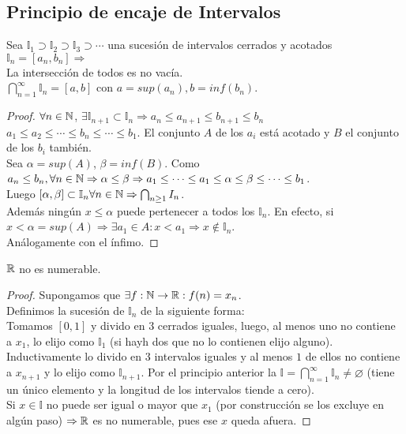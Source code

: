 \subsection{Principio de encaje de Intervalos}

\begin{theorem}
    Sea $\mathbb{I}_1 \supset \mathbb{I}_2 \supset \mathbb{I}_3 \supset \cdots $ una sucesión de intervalos cerrados y acotados $\mathbb{I}_n = [a_n, b_n] \Rightarrow$ \\
    La intersección de todos es no vacía. \\
    $\bigcap_{n=1}^{\infty} \mathbb{I}_n = [a,b]$ con $a = sup(a_n), b=inf(b_n)$.
    \begin{proof}
        $\forall n \in \mathbb{N}$, $\exists \mathbb{I}_{n+1} \subset \mathbb{I}_n \Rightarrow a_n \leq a_{n+1} \leq b_{n+1} \leq b_n$ \\
        $a_1 \leq a_2 \leq \cdots \leq b_n \leq \cdots \leq b_1$. El conjunto $A$ de los $a_i$ está acotado y $B$ el conjunto de los $b_i$ también. \\
        Sea $\alpha = sup(A)$, $\beta = inf(B)$. Como $a_n \leq b_n, \forall n \in \mathbb{N} \Rightarrow \alpha \leq \beta \Rightarrow a_1 \leq \cdots \leq a_1 \leq \alpha \leq \beta \leq \cdots \leq b_1$. \\
        Luego $[\alpha, \beta] \subset \mathbb{I}_n \forall n \in \mathbb{N} \Rightarrow \bigcap_{n\geq1} I_n$. \\
        Además ningún $x \leq \alpha$ puede pertenecer a todos los $\mathbb{I}_n$. En efecto, si $x < \alpha = sup(A) \Rightarrow \exists a_1\in A: x<a_1 \Rightarrow x\notin \mathbb{I}_n$. \\
        Análogamente con el ínfimo.
    \end{proof}
\end{theorem}

\begin{theorem}
    $\mathbb{R}$  no es numerable.
    \begin{proof}
        Supongamos que $\exists f:\mathbb{N} \to \mathbb{R} : f(n) = x_n$. \\
        Definimos la sucesión de $\mathbb{I}_n$ de la siguiente forma: \\
        Tomamos $[0, 1]$ y divido en $3$ cerrados iguales, luego, al menos uno no contiene a $x_1$, lo elijo como $\mathbb{I}_1$ (si hayh dos que no lo contienen elijo alguno). Inductivamente lo divido en $3$ intervalos iguales y al menos $1$ de ellos no contiene a $x_{n+1}$ y lo elijo como $\mathbb{I}_{n+1}$. Por el principio anterior la $\mathbb{I} = \bigcap_{n=1}^\infty \mathbb{I}_n \neq \varnothing$ (tiene un único elemento y la longitud de los intervalos tiende a cero). \\
        Si $x \in \mathbb{I}$ no puede ser igual o mayor que $x_1$ (por construcción se los excluye en algún paso) $\Rightarrow \mathbb{R}$ es no numerable, pues ese $x$ queda afuera.
    \end{proof}
\end{theorem}

